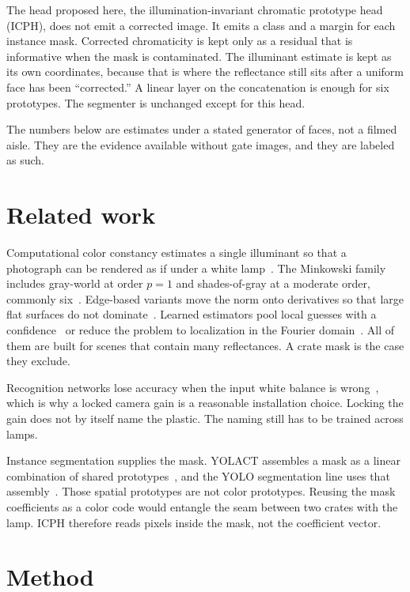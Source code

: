 \documentclass[10pt]{article}
\begin{document}
The head proposed here, the illumination-invariant chromatic prototype head (ICPH), does not emit a corrected image. It emits a class and a margin for each instance mask. Corrected chromaticity is kept only as a residual that is informative when the mask is contaminated. The illuminant estimate is kept as its own coordinates, because that is where the reflectance still sits after a uniform face has been ``corrected.'' A linear layer on the concatenation is enough for six prototypes. The segmenter is unchanged except for this head.

The numbers below are estimates under a stated generator of faces, not a filmed aisle. They are the evidence available without gate images, and they are labeled as such.

\section{Related work}
Computational color constancy estimates a single illuminant so that a photograph can be rendered as if under a white lamp~\cite{gijsenij2011}. The Minkowski family includes gray-world at order $p=1$ and shades-of-gray at a moderate order, commonly six~\cite{buchsbaum1980,finlayson2004}. Edge-based variants move the norm onto derivatives so that large flat surfaces do not dominate~\cite{vandeweijer2007}. Learned estimators pool local guesses with a confidence~\cite{hu2017} or reduce the problem to localization in the Fourier domain~\cite{barron2017}. All of them are built for scenes that contain many reflectances. A crate mask is the case they exclude.

Recognition networks lose accuracy when the input white balance is wrong~\cite{afifi2019}, which is why a locked camera gain is a reasonable installation choice. Locking the gain does not by itself name the plastic. The naming still has to be trained across lamps.

Instance segmentation supplies the mask. YOLACT assembles a mask as a linear combination of shared prototypes~\cite{bolya2019}, and the YOLO segmentation line uses that assembly~\cite{jocher2023}. Those spatial prototypes are not color prototypes. Reusing the mask coefficients as a color code would entangle the seam between two crates with the lamp. ICPH therefore reads pixels inside the mask, not the coefficient vector.

\section{Method}
\end{document}
